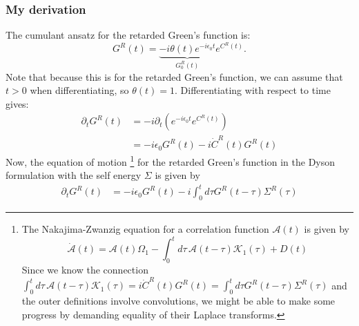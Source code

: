 \subsubsection{My derivation}
 The cumulant ansatz for the retarded Green's function is:
\begin{equation}
    G^R(t)=\underbrace{-i \theta(t) e^{-i \epsilon_0 t}}_{G_0^R(t)} e^{C^R(t)} .
\end{equation}
Note that because this is for the retarded Green's function, we can assume that $t>0$ when differentiating, so $\theta(t)=1$. 
Differentiating with respect to time gives:
\begin{align}
    \partial_t G^R(t)&=-i\partial_t\left(e^{-i \epsilon_0 t} e^{C^R(t)}\right)\\
    &= -i \epsilon_0 G^R(t) - i \dot{C}^R(t) G^R(t)
\end{align}
 Now, the equation of motion
\footnote{
The Nakajima-Zwanzig equation for a correlation function $\mathcal{A}(t)$ is given by
\begin{equation}
\dot{\mathcal{A}}(t) = \mathcal{A}(t) {\Omega_1} - \int_{0}^{t} d \tau\, \mathcal{A}(t - \tau) \mathcal{K}_1(\tau) + D(t)
\label{eq:GQME}
\end{equation}
Since we know the connection $\int_{0}^{t} d \tau\, \mathcal{A}(t - \tau) \mathcal{K}_1(\tau) = i \dot{C}^R(t) G^R(t) = \int_0^t d \tau G^R(t-\tau) \Sigma^R(\tau)$ and the outer definitions involve convolutions, we might be able to make some progress by demanding equality of their Laplace transforms.}
for the retarded Green's function in the Dyson formulation with the self energy $\Sigma$ is given by
\begin{align}
 \partial_t G^R(t)&=-i \epsilon _0 G^R(t)-i \int_0^t d \tau G^R(t-\tau) \Sigma^R(\tau)
\end{align}
